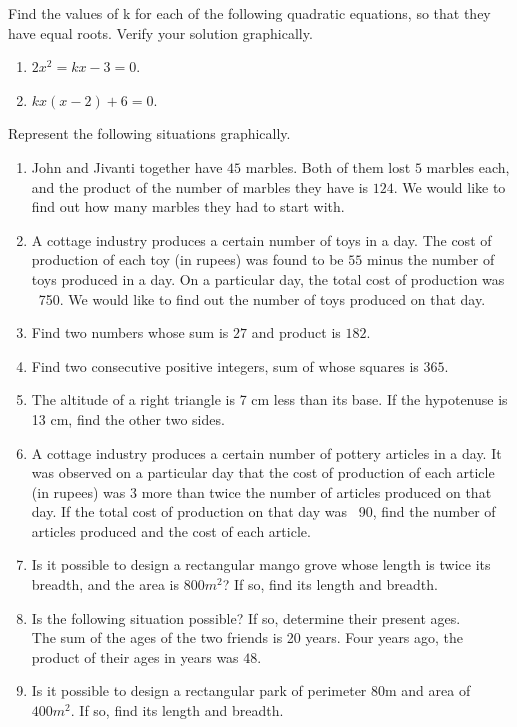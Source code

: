 Find the values of k for each of the following quadratic equations, so that they have equal roots.  Verify your solution graphically.
\begin{enumerate}[label=\thesubsection.\arabic*,ref=\thesubsection.\theenumi,resume*]
\item $2x^2=kx-3=0$.
\item $kx(x-2)+6=0$.
\end{enumerate}
Represent the following situations graphically.
\begin{enumerate}[label=\thesubsection.\arabic*,ref=\thesubsection.\theenumi,resume*]
\item John and Jivanti together have $45$ marbles. Both of them lost $5$ marbles each, and the product of the number of marbles they have is $124$. We would like to find out how many marbles they had to start with.
\item A cottage industry produces a certain number of toys in a day. The cost of production of each toy (in rupees) was found to be $55$ minus the number of toys produced in a day. On a particular day, the total cost of production was \rupee~750. We would like to find out the number of toys produced on that day.
\item Find two numbers whose sum is $27$ and product is $182$.
\item Find two consecutive  positive integers, sum of whose squares is $365$.
\item  The altitude of a right triangle is 7 cm less than its base. If the hypotenuse is 13 cm, find the other two sides.
\item A cottage industry produces a certain number of pottery articles in a day. It was observed on a particular day that the cost of production of each article (in rupees) was $3$ more than twice the number of articles produced on that day. If the total cost of production on that day was \rupee~90, find the number of articles produced and the cost of each article.
\item Is it possible to design a rectangular mango grove whose length is twice its breadth, and the area is  $800m^2$? If so, find its length and breadth.
\item Is the following situation possible? If so, determine their present ages.
\\ The sum of the ages of the two friends is 20 years. Four years ago, the product of their ages in years was $48$.
\item Is it possible to design a rectangular park of perimeter 80m and area of $400m^2$. If so, find its length and breadth.

\end{enumerate}
